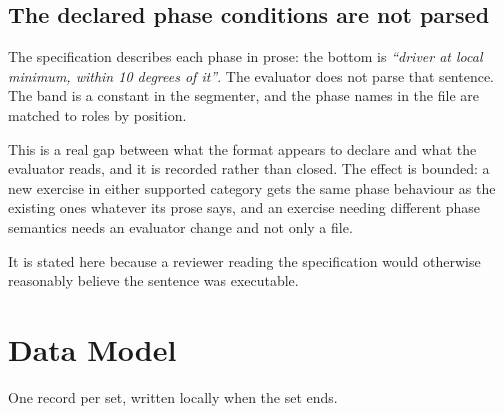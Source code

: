 \subsection{The declared phase conditions are not parsed}
\label{sec:7.4.1}

The specification describes each phase in prose: the bottom is \textit{``driver at local minimum, within 10 degrees of it''}. The evaluator does not parse that sentence. The band is a constant in the segmenter, and the phase names in the file are matched to roles by position.

This is a real gap between what the format appears to declare and what the evaluator reads, and it is recorded rather than closed. The effect is bounded: a new exercise in either supported category gets the same phase behaviour as the existing ones whatever its prose says, and an exercise needing different phase semantics needs an evaluator change and not only a file.

It is stated here because a reviewer reading the specification would otherwise reasonably believe the sentence was executable.

\section{Data Model}
\label{sec:7.5}

One record per set, written locally when the set ends.


